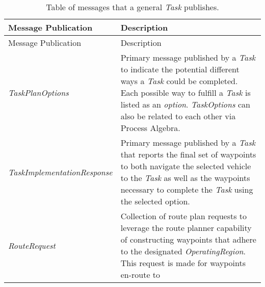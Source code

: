 \begin{longtable}[c]{@{}ll@{}}
\caption{Table of messages that a general \emph{Task}
publishes.}\tabularnewline
\toprule
\begin{minipage}[b]{0.29\columnwidth}\raggedright\strut
Message Publication
\strut\end{minipage} &
\begin{minipage}[b]{0.65\columnwidth}\raggedright\strut
Description
\strut\end{minipage}\tabularnewline
\midrule
\endfirsthead
\toprule
\begin{minipage}[b]{0.29\columnwidth}\raggedright\strut
Message Publication
\strut\end{minipage} &
\begin{minipage}[b]{0.65\columnwidth}\raggedright\strut
Description
\strut\end{minipage}\tabularnewline
\midrule
\endhead
\begin{minipage}[t]{0.29\columnwidth}\raggedright\strut
\emph{TaskPlanOptions}
\strut\end{minipage} &
\begin{minipage}[t]{0.65\columnwidth}\raggedright\strut
Primary message published by a \emph{Task} to indicate the potential
different ways a \emph{Task} could be completed. Each possible way to
fulfill a \emph{Task} is listed as an \emph{option}. \emph{TaskOptions}
can also be related to each other via Process Algebra.
\strut\end{minipage}\tabularnewline
\begin{minipage}[t]{0.29\columnwidth}\raggedright\strut
\emph{TaskImplementationResponse}
\strut\end{minipage} &
\begin{minipage}[t]{0.65\columnwidth}\raggedright\strut
Primary message published by a \emph{Task} that reports the final set of
waypoints to both navigate the selected vehicle to the \emph{Task} as
well as the waypoints necessary to complete the \emph{Task} using the
selected option.
\strut\end{minipage}\tabularnewline
\begin{minipage}[t]{0.29\columnwidth}\raggedright\strut
\emph{RouteRequest}
\strut\end{minipage} &
\begin{minipage}[t]{0.65\columnwidth}\raggedright\strut
Collection of route plan requests to leverage the route planner
capability of constructing waypoints that adhere to the designated
\emph{OperatingRegion}. This request is made for waypoints en-route to

\end{minipage}
\end{longtable}
